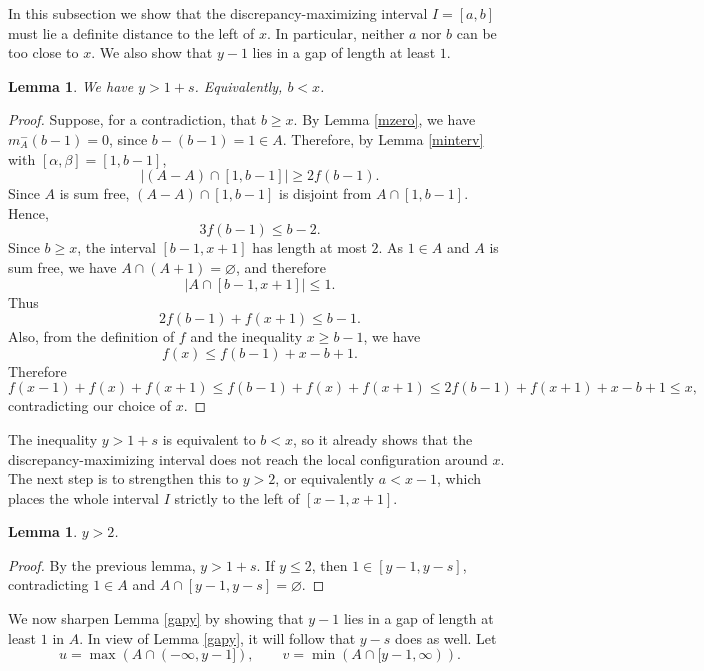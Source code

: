 \documentclass[11pt,reqno]{amsart}
\newtheorem{lem}[thm]{Lemma}
\theoremstyle{definition}
\def\F#1{f(#1)}
\begin{document}
In this subsection we show that the discrepancy-maximizing interval $I=[a,b]$ must lie a definite distance to the left of $x$. In particular, neither $a$ nor $b$ can be too close to $x$. We also show that $y-1$ lies in a gap of length at least $1$.
\begin{lem}
    We have $y > 1 + s$. Equivalently, $b < x$. 
\end{lem}
\begin{proof}
    Suppose, for a contradiction, that $b\geq x$. By Lemma \ref{mzero},
    we have $m_A^-(b-1)=0$, since $b-(b-1)=1\in A$. Therefore, by
    Lemma \ref{minterv} with $[\alpha,\beta]=[1,b-1]$,
    $$
        |(A-A)\cap[1,b-1]|\geq 2\F{b-1}.
    $$
    Since $A$ is sum free, $(A-A)\cap[1,b-1]$ is disjoint from
    $A\cap[1,b-1]$. Hence,  
    $$
        3\F{b-1}\leq b-2.
    $$
    Since $b\geq x$, the interval $[b-1,x+1]$ has length at most $2$.
    As $1\in A$ and $A$ is sum free, we have $A\cap(A+1)=\varnothing$,
    and therefore
    $$
        |A\cap[b-1,x+1]|\leq 1.
    $$
    Thus
    $$
        2\F{b-1}+\F{x+1}\leq b-1.
    $$
Also, from the definition of $f$ and the inequality $x\geq b-1$, we have
$$
    \F{x}\leq \F{b-1}+x-b+1.
$$
    Therefore
    $$
        \F{x-1}+\F{x}+\F{x+1}
        \leq \F{b-1}+\F{x}+\F{x+1}
        \leq 2\F{b-1}+\F{x+1}+x-b+1
        \leq x,
    $$
    contradicting our choice of $x$.
\end{proof}
The inequality $y>1+s$ is equivalent to $b<x$, so it already shows that the discrepancy-maximizing interval does not reach the local configuration around $x$. The next step is to strengthen this to $y>2$, or equivalently $a<x-1$, which places the whole interval $I$ strictly to the left of $[x-1,x+1]$.
\begin{lem}
    $y > 2$. 
\end{lem}
\begin{proof}
    By the previous lemma, $y > 1 + s$. If $y\leq 2$, then $1\in [y - 1, y - s]$, contradicting $1\in A$ and $A\cap [y - 1, y - s]=\varnothing$.
\end{proof}





We now sharpen Lemma \ref{gapy} by showing that $y-1$ lies in a gap of length at least $1$ in $A$. In view of Lemma \ref{gapy}, it will follow that $y-s$ does as well. Let
$$
u=\max(A\cap(-\infty,y-1]),\qquad v=\min(A\cap [y-1,\infty)).
$$
\end{document}
